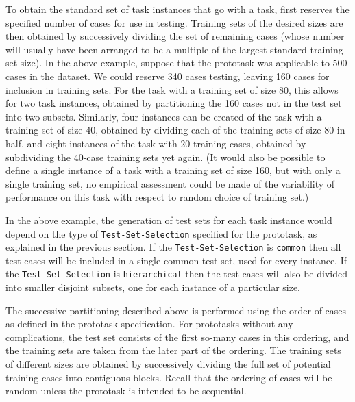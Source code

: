 To obtain the standard set of task instances that go with a task,
\delve{} first reserves the specified number of cases for use in
testing.  Training sets of the desired sizes are then obtained by
successively dividing the set of remaining cases (whose number will
usually have been arranged to be a multiple of the largest standard
training set size).  In the above example, suppose that the prototask
was applicable to 500 cases in the dataset.  We could reserve 340
cases testing, leaving 160 cases for inclusion in training sets.  For
the task with a training set of size 80, this allows for two task
instances, obtained by partitioning the 160 cases not in the test set
into two subsets.  Similarly, four instances can be created of the
task with a training set of size 40, obtained by dividing each of the
training sets of size 80 in half, and eight instances of the task with
20 training cases, obtained by subdividing the 40-case training sets
yet again.  (It would also be possible to define a single instance of
a task with a training set of size 160, but with only a single
training set, no empirical assessment could be made of the variability
of performance on this task with respect to random choice of training
set.)

In the above example, the generation of test sets for each task
instance would depend on the type of {\tt Test-Set-Selection}
specified for the prototask, as explained in the previous section. If
the {\tt Test-Set-Selection} is {\tt common} then all test cases will
be included in a single common test set, used for every instance. If
the {\tt Test-Set-Selection} is {\tt hierarchical} then the test cases
will also be divided into smaller disjoint subsets, one for each
instance of a particular size.

The successive partitioning described above is performed using the
order of cases as defined in the prototask specification.  For
prototasks without any complications, the test set consists of the
first so-many cases in this ordering, and the training sets are taken
from the later part of the ordering.  The training sets of different
sizes are obtained by successively dividing the full set of potential
training cases into contiguous blocks.  Recall that the ordering of
cases will be random unless the prototask is intended to be
sequential.

